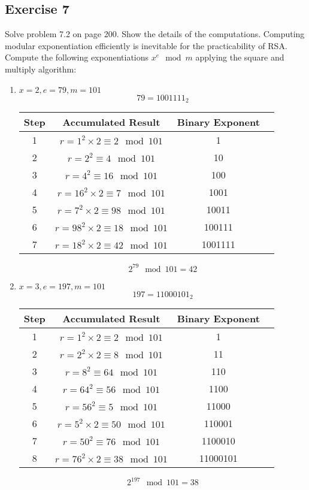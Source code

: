 \documentclass{math}
\begin{document}
\subsection*{Exercise 7}
Solve problem 7.2 on page 200. Show the details of the computations. Computing
modular exponentiation efficiently is inevitable for the practicability of RSA.
Compute the following exponentiations \( x^e\mod m \) applying the square and
multiply algorithm:
\begin{enumerate}
  \item \( x = 2, e = 79, m = 101 \)
  \[ 79 = 1001111_2 \]
  \begin{center}
    \begin{tabular}{|c|c|c|c|}
      \hline
      Step & Accumulated Result & Binary Exponent \\
      \hline
      1 & \( r = 1^2\times2 \equiv 2\mod101 \) & 1 \\
      \hline
      2 & \( r = 2^2 \equiv 4\mod101 \) & 10 \\
      \hline
      3 & \( r = 4^2 \equiv 16\mod101 \) & 100 \\
      \hline
      4 & \( r = 16^2\times2 \equiv 7\mod101 \) & 1001 \\
      \hline
      5 & \( r = 7^2\times2 \equiv 98\mod101 \) & 10011  \\
      \hline
      6 & \( r = 98^2\times2 \equiv 18\mod101 \) & 100111 \\
      \hline
      7 & \( r = 18^2\times2 \equiv 42\mod101 \) & 1001111 \\
      \hline
    \end{tabular}
  \end{center}
  \[ 2^{79}\mod101 = 42 \]
  \item \( x = 3, e = 197, m = 101 \)
  \[ 197 = 11000101_2 \]
  \begin{center}
    \begin{tabular}{|c|c|c|c|}
      \hline
      Step & Accumulated Result & Binary Exponent \\
      \hline
      1 & \( r = 1^2\times2 \equiv 2\mod101 \) & 1 \\
      \hline
      2 & \( r = 2^2\times2 \equiv 8\mod101 \) & 11 \\
      \hline
      3 & \( r = 8^2 \equiv 64\mod101 \) & 110 \\
      \hline
      4 & \( r = 64^2 \equiv 56\mod101 \) & 1100 \\
      \hline
      5 & \( r = 56^2 \equiv 5\mod101 \) & 11000  \\
      \hline
      6 & \( r = 5^2\times2 \equiv 50\mod101 \) & 110001 \\
      \hline
      7 & \( r = 50^2 \equiv 76\mod101 \) & 1100010 \\
      \hline
      8 & \( r = 76^2\times2 \equiv 38\mod101 \) & 11000101 \\
      \hline
    \end{tabular}
  \end{center}
  \[ 2^{197}\mod101 = 38 \]
\end{enumerate}
\end{document}

